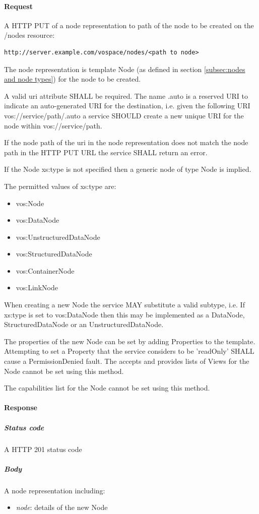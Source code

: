 \documentclass[11pt,a4paper]{ivoa}
\begin{document}
\paragraph{Request}
A HTTP PUT of a node representation to path of the node to be created on the /nodes resource:
\begin{verbatim}
http://server.example.com/vospace/nodes/<path to node>
\end{verbatim}
The node representation is template Node (as defined in section \ref{subsec:nodes and node types}) for the node to be created.

A valid uri attribute SHALL be required. The name .auto is a reserved URI to indicate an auto-generated URI for the destination, i.e. given the following URI vos://service/path/.auto a service SHOULD create a new unique URI for the node within vos://service/path.

If the node path of the uri in the node representation does not match the node path in the HTTP PUT URL the service SHALL return an error.

If the Node xs:type is not specified then a generic node of type Node is implied.

The permitted values of xs:type are:

\begin{itemize}
    \item vos:Node
    \item vos:DataNode
    \item vos:UnstructuredDataNode
    \item vos:StructuredDataNode
    \item vos:ContainerNode
    \item vos:LinkNode
\end{itemize}

When creating a new Node the service MAY substitute a valid subtype, i.e. If xs:type is set to vos:DataNode then this may be implemented as a DataNode, StructuredDataNode or an UnstructuredDataNode.

The properties of the new Node can be set by adding Properties to the template. Attempting to set a Property that the service considers to be 'readOnly' SHALL cause a PermissionDenied fault. The accepts and provides lists of Views for the Node cannot be set using this method.

The capabilities list for the Node cannot be set using this method.

\paragraph{Response}
\subparagraph{Status code} A HTTP 201 status code
\subparagraph{Body}
A node representation including:
\begin{itemize}
    \item \emph{node}: details of the new Node
\end{itemize}
\end{document}
